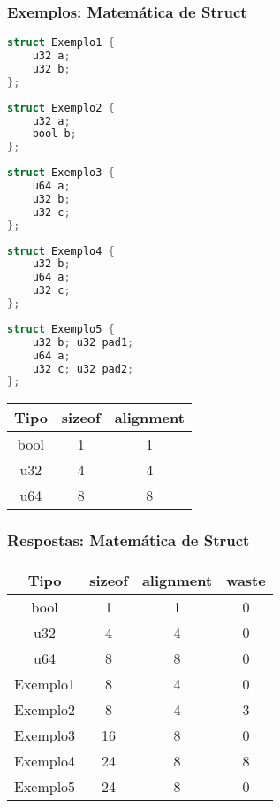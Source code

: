 \documentclass{beamer}
\newcommand{\tabelasizealign}{%
    \begin{tabular}{|c|c|c|}%
        \hline%
        Tipo & sizeof & alignment \\\hline%
        \hline%
        bool & 1      & 1         \\\hline%
        u32  & 4      & 4         \\\hline%
        u64  & 8      & 8         \\\hline%
    \end{tabular}%
}
\begin{document}
\begin{frame}[fragile]
    \frametitle{Exemplos: Matemática de Struct}
    \begin{multicols}{2}
        \begin{lstlisting}[language=C]
struct Exemplo1 {
    u32 a;
    u32 b;
};
        \end{lstlisting}
        \begin{lstlisting}[language=C]
struct Exemplo2 {
    u32 a;
    bool b;
};
        \end{lstlisting}
        \begin{lstlisting}[language=C]
struct Exemplo3 {
    u64 a;
    u32 b;
    u32 c;
};
        \end{lstlisting}
        \columnbreak
        \begin{lstlisting}[language=C]
struct Exemplo4 {
    u32 b;
    u64 a;
    u32 c;
};
        \end{lstlisting}
        \begin{lstlisting}[language=C]
struct Exemplo5 {
    u32 b; u32 pad1;
    u64 a;
    u32 c; u32 pad2;
};
        \end{lstlisting}
        \tabelasizealign{}
    \end{multicols}
\end{frame}

\begin{frame}
    \frametitle{Respostas: Matemática de Struct}
    \begin{center} \begin{tabular}{|c|c|c||c|}
        \hline%
        Tipo      & sizeof & alignment & waste \\\hline
        \hline
        bool      & 1      & 1         & 0     \\\hline
        u32       & 4      & 4         & 0     \\\hline
        u64       & 8      & 8         & 0     \\\hline
        \hline
        Exemplo1  & 8      & 4         & 0     \\\hline
        Exemplo2  & 8      & 4         & 3     \\\hline
        Exemplo3  & 16     & 8         & 0     \\\hline
        Exemplo4  & 24     & 8         & 8     \\\hline
        Exemplo5  & 24     & 8         & 0     \\\hline
    \end{tabular} \end{center}
\end{frame}
\end{document}
